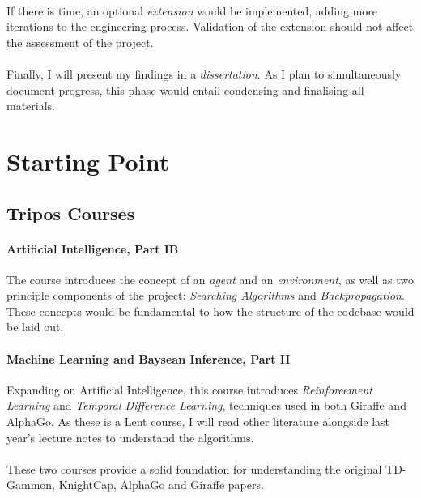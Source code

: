 \documentclass[a4paper]{article}
\begin{document}
\paragraph{}If there is time, an optional \textit{extension} would be implemented, adding more iterations to the engineering process. Validation of the extension should not affect the assessment of the project.

\paragraph{}Finally, I will present my findings in a \textit{dissertation}. As I plan to simultaneously document progress, this phase would entail condensing and finalising all materials.


\section*{Starting Point}

\subsection*{Tripos Courses}

\paragraph{Artificial Intelligence, Part IB} The course introduces the concept of an \textit{agent} and an \textit{environment}, as well as two principle components of the project: \textit{Searching Algorithms} and \textit{Backpropagation}. These concepts would be fundamental to how the structure of the codebase would be laid out.

\paragraph{Machine Learning and Baysean Inference, Part II} Expanding on Artificial Intelligence, this course introduces \textit{Reinforcement Learning} and \textit{Temporal Difference Learning}, techniques used in both Giraffe and AlphaGo. As these is a Lent course, I will read other literature alongside last year's lecture notes to understand the algorithms.

\paragraph{} These two courses provide a solid foundation for understanding the original TD-Gammon, KnightCap, AlphaGo and Giraffe papers.
\end{document}
